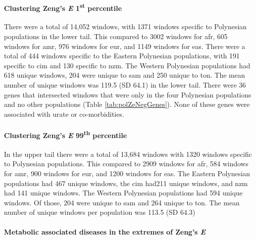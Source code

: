 \documentclass[twoside,openright]{report}
\let\oldparagraph\paragraph
\renewcommand{\paragraph}[1]{\oldparagraph{#1}\mbox{}}
\begin{document}
\paragraph{\texorpdfstring{Clustering Zeng's \emph{E}
1\textsuperscript{st}
percentile}{Clustering Zeng's E 1st percentile}}\label{clustering-zengs-e-1st-percentile}

There were a total of 14,052 windows, with 1371 windows specific to
Polynesian populations in the lower tail. This compared to 3002 windows
for \gls{afr}, 605 windows for \gls{amr}, 976 windows for \gls{eur}, and
1149 windows for \gls{eas}. There were a total of 444 windows specific
to the Eastern Polynesian populations, with 191 specific to \gls{cim}
and 130 specific to \gls{nzm}. The Western Polynesian populations had
618 unique windows, 204 were unique to \gls{sam} and 250 unique to
\gls{ton}. The mean number of unique windows was 119.5 (SD 64.1) in the
lower tail. There were 36 genes that intersected windows that were only
in the four Polynesian populations and no other populations (Table
\ref{tab:polZeNegGenes}). None of these genes were associated with urate
or co-morbidities.

\paragraph{\texorpdfstring{Clustering Zeng's \emph{E}
99\textsuperscript{th}
percentile}{Clustering Zeng's E 99th percentile}}\label{clustering-zengs-e-99th-percentile}

In the upper tail there were a total of 13,684 windows with 1320 windows
specific to Polynesian populations. This compared to 2909 windows for
\gls{afr}, 584 windows for \gls{amr}, 900 windows for \gls{eur}, and
1200 windows for \gls{eas}. The Eastern Polynesian populations had 467
unique windows, the \gls{cim} had211 unique windows, and \gls{nzm} had
141 unique windows. The Western Polynesian populations had 594 unique
windows. Of those, 204 were unique to \gls{sam} and 264 unique to
\gls{ton}. The mean number of unique windows per population was 113.5
(SD 64.3)

\paragraph{\texorpdfstring{Metabolic associated diseases in the extremes
of Zeng's
\emph{E}}{Metabolic associated diseases in the extremes of Zeng's E}}\label{metabolic-associated-diseases-in-the-extremes-of-zengs-e}
\end{document}
